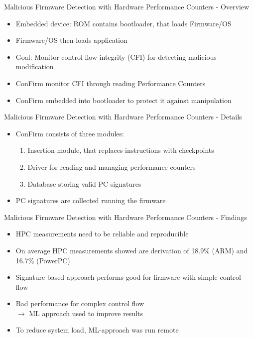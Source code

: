 \documentclass[aspectratio=169]{beamer}
\begin{document}
\begin{frame}{Malicious Firmware Detection with Hardware Performance Counters - Overview}
    \begin{itemize}
        \item Embedded device: ROM contains bootloader, that loads Firmware/OS
        \item Firmware/OS then loads application
        \item Goal: Monitor control flow integrity (CFI) for detecting malicious modification
        \item ConFirm monitor CFI through reading Performance Counters
        \item ConFirm embedded into bootloader to protect it against manipulation
    \end{itemize}
\end{frame}
\begin{frame}{Malicious Firmware Detection with Hardware Performance Counters - Details}
    \begin{itemize}
        \item ConFirm consists of three modules:
              \begin{enumerate}
                  \item Insertion module, that replaces instructions with checkpoints
                  \item Driver for reading and managing performance counters
                  \item Database storing valid PC signatures
              \end{enumerate}
        \item PC signatures are collected running the firmware
    \end{itemize}
\end{frame}
\begin{frame}{Malicious Firmware Detection with Hardware Performance Counters - Findings}
    \begin{itemize}
        \item HPC measurements need to be reliable and reproducible
        \item On average HPC measurements showed are derivation of 18.9\% (ARM) and 16.7\% (PowerPC)
        \item Signature based approach performs good for firmware with simple control flow
        \item Bad performance for complex control flow
              \\$\rightarrow$ ML approach used to improve results
        \item To reduce system load, ML-approach was run remote
    \end{itemize}
\end{frame}
\end{document}
